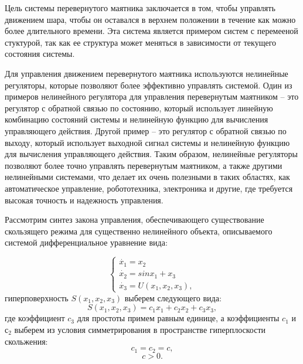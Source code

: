 Цель системы перевернутого маятника заключается в том, чтобы управлять движением шара, чтобы он оставался в верхнем положении в течение как можно более длительного времени. Эта система является примером систем с перемееной стуктурой, так как ее структура может меняться в зависимости от текущего состояния системы.

Для управления движением перевернутого маятника используются нелинейные регуляторы, которые позволяют более эффективно управлять системой. Один из примеров нелинейного регулятора для управления перевернутым маятником -- это регулятор с обратной связью по состоянию, который использует линейную комбинацию состояний системы и нелинейную функцию для вычисления управляющего действия. Другой пример -- это регулятор с обратной связью по выходу, который использует выходной сигнал системы и нелинейную функцию для вычисления управляющего действия. Таким образом, нелинейные регуляторы позволяют более точно управлять перевернутым маятником, а также другими нелинейными системами, что делает их очень полезными в таких областях, как автоматическое управление, робототехника, электроника и другие, где требуется высокая точность и надежность управления.

Рассмотрим синтез закона управления, обеспечивающего существование скользящего режима для существенно нелинейного объекта, описываемого системой дифференциальное уравнение вида:

\begin{equation}\label{eq1}
    \begin{cases}
        \dot{x_1} = x_2\\
        \dot{x_2} = sin{x_1} + x_3\\
        \dot{x_3} = U(x_1, x_2, x_3),
    \end{cases}
\end{equation}
\noindent гиперповерхность $S(x_1,x_2,x_3)$ выберем следующего вида:
\begin{equation}\label{eq2}
    S(x_1,x_2,x_3) = c_1x_1+c_2x_2+c_3x_3,
\end{equation}
\noindent где коэффициент $c_3$ для простоты примем равным единице, а коэффициенты $c_1$ и $с_2$ выберем из условия симметрирования в пространстве гиперплоскости скольжения: 
\begin{equation}\label{eq2}
    c_1=c_2=c,
\end{equation}
\begin{equation}\label{eq2}
    c>0 . 
\end{equation}

